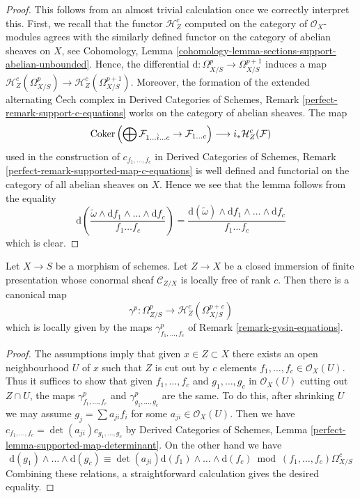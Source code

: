 \begin{proof}
This follows from an almost trivial calculation once
we correctly interpret this. First, we recall that the functor
$\mathcal{H}^c_Z$ computed on the category of $\mathcal{O}_X$-modules
agrees with the similarly defined functor on the category of abelian
sheaves on $X$, see
Cohomology, Lemma \ref{cohomology-lemma-sections-support-abelian-unbounded}.
Hence, the differential $\text{d} : \Omega^p_{X/S} \to \Omega^{p + 1}_{X/S}$
induces a map
$\mathcal{H}^c_Z(\Omega^p_{X/S}) \to \mathcal{H}^c_Z(\Omega^{p + 1}_{X/S})$.
Moreover, the formation of the extended alternating {\v C}ech complex in
Derived Categories of Schemes, Remark \ref{perfect-remark-support-c-equations}
works on the category of abelian sheaves. The map
$$
\mathop{\mathrm{Coker}}\left(\bigoplus \mathcal{F}_{1 \ldots \hat i \ldots c} \to
\mathcal{F}_{1 \ldots c}\right)
\longrightarrow
i_*\mathcal{H}^c_Z(\mathcal{F})
$$
used in the construction of $c_{f_1, \ldots, f_c}$ in
Derived Categories of Schemes, Remark
\ref{perfect-remark-supported-map-c-equations}
is well defined and
functorial on the category of all abelian sheaves on $X$.
Hence we see that the lemma follows from the equality
$$
\text{d}\left(
\frac{\tilde \omega \wedge \text{d}f_1 \wedge \ldots \wedge
\text{d}f_c}{f_1 \ldots f_c}\right) =
\frac{\text{d}(\tilde \omega) \wedge
\text{d}f_1 \wedge \ldots \wedge \text{d}f_c}{f_1 \ldots f_c}
$$
which is clear.
\end{proof}

\begin{lemma}
\label{lemma-gysin-global}
Let $X \to S$ be a morphism of schemes. Let $Z \to X$ be a closed immersion
of finite presentation whose conormal sheaf $\mathcal{C}_{Z/X}$ is
locally free of rank $c$. Then there is a canonical map
$$
\gamma^p : \Omega^p_{Z/S} \to \mathcal{H}^c_Z(\Omega^{p + c}_{X/S})
$$
which is locally given by the maps $\gamma^p_{f_1, \ldots, f_c}$
of Remark \ref{remark-gysin-equations}.
\end{lemma}

\begin{proof}
The assumptions imply that given $x \in Z \subset X$ there exists an
open neighbourhood $U$ of $x$ such that $Z$ is cut out by $c$
elements $f_1, \ldots, f_c \in \mathcal{O}_X(U)$. Thus
it suffices to show that given $f_1, \ldots, f_c$ and
$g_1, \ldots, g_c$ in $\mathcal{O}_X(U)$ cutting out $Z \cap U$,
the maps $\gamma^p_{f_1, \ldots, f_c}$
and $\gamma^p_{g_1, \ldots, g_c}$ are the same. To do this, after shrinking
$U$ we may assume $g_j = \sum a_{ji} f_i$ for some
$a_{ji} \in \mathcal{O}_X(U)$. Then we have
$c_{f_1, \ldots, f_c} = \det(a_{ji}) c_{g_1, \ldots, g_c}$ by
Derived Categories of Schemes, Lemma
\ref{perfect-lemma-supported-map-determinant}.
On the other hand we have
$$
\text{d}(g_1) \wedge \ldots \wedge \text{d}(g_c) \equiv
\det(a_{ji}) \text{d}(f_1) \wedge \ldots \wedge \text{d}(f_c)
\bmod (f_1, \ldots, f_c)\Omega^c_{X/S}
$$
Combining these relations, a straightforward calculation gives the
desired equality.
\end{proof}


